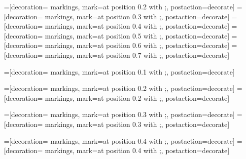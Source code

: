 
\usepackage{tikz,tikz-cd} %
\usetikzlibrary{arrows,shapes,trees}
\usetikzlibrary{backgrounds}
\usetikzlibrary{calc,decorations.pathmorphing,patterns}
\usetikzlibrary{decorations.markings}

\usetikzlibrary{positioning} %


=[decoration={ markings, mark=at position 0.2 with {;}}, postaction={decorate}]
=[decoration={ markings, mark=at position 0.3 with {;}}, postaction={decorate}]
=[decoration={ markings, mark=at position 0.4 with {;}}, postaction={decorate}]
=[decoration={ markings, mark=at position 0.5 with {;}}, postaction={decorate}]
=[decoration={ markings, mark=at position 0.6 with {;}}, postaction={decorate}]
=[decoration={ markings, mark=at position 0.7 with {;}}, postaction={decorate}]

\newcommand\PathArrowLineWidth{1.8pt}
\newcommand\PathArrowStyle{to}
=[decoration={ markings, mark=at position 0.1 with {\arrow[line width=\PathArrowLineWidth]{\PathArrowStyle};}}, postaction={decorate}]

=[decoration={ markings, mark=at position 0.2 with {\arrow[line width=\PathArrowLineWidth]{\PathArrowStyle};}}, postaction={decorate}]
=[decoration={ markings, mark=at position 0.2 with {\arrow[line width=0.7*\PathArrowLineWidth]{\PathArrowStyle};}}, postaction={decorate}]

=[decoration={ markings, mark=at position 0.3 with {\arrow[line width=\PathArrowLineWidth]{\PathArrowStyle};}}, postaction={decorate}]
=[decoration={ markings, mark=at position 0.3 with {\arrow[line width=0.7*\PathArrowLineWidth]{\PathArrowStyle};}}, postaction={decorate}]

=[decoration={ markings, mark=at position 0.4 with {\arrow[line width=\PathArrowLineWidth]{\PathArrowStyle};}}, postaction={decorate}]
=[decoration={ markings, mark=at position 0.4 with {\arrow[line width=0.7*\PathArrowLineWidth]{\PathArrowStyle};}}, postaction={decorate}]

